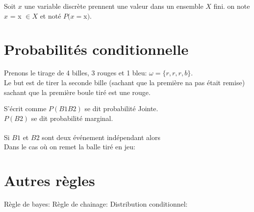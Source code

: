 Soit $x$ une variable discrète prennent une valeur dans un ensemble $X$ fini.
on note $x$ = x $\in X$ et noté $P(x=$x$)$.


\section{Probabilités conditionnelle}
Prenons le tirage de 4 billes, 3 rouges et 1 bleu: $\omega = \{r,r,r,b\}$.\\
Le but est de tirer la seconde bille (sachant que la première na pas était remise) sachant que la première boule tiré est une rouge.\\


S'écrit comme
$P(B1 B2)$ se dit probabilité Jointe.\\
$P(B2)$ se dit probabilité marginal.\\
\\
Si $B1$ et $B2$ sont deux événement indépendant alors 
\ \\
Dans le cas où on remet la balle tiré en jeu:
\pagebreak

\section{Autres règles}
Règle de bayes:
Règle de chainage:
\formula{$P(x_1,x_2,x_3,...x_n$] = $p(x_1)*p(x_2|x_1)*...*p(x_n|x_{n-1}..x_1)$}
Distribution conditionnel:

